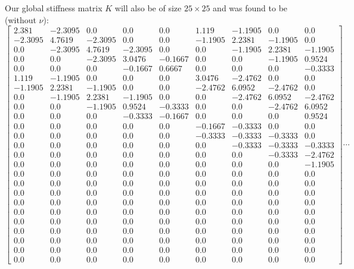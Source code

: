 \documentclass[12pt]{article}
\begin{document}
Our global stiffness matrix $K$ will also be of size $25 \times 25$ and was found to be (without $\nu$):
\[\left[\begin{matrix}2.381 & -2.3095 & 0.0 & 0.0 & 0.0 & 1.119 & -1.1905 & 0.0 & 0.0\\-2.3095 & 4.7619 & -2.3095 & 0.0 & 0.0 & -1.1905 & 2.2381 & -1.1905 & 0.0\\0.0 & -2.3095 & 4.7619 & -2.3095 & 0.0 & 0.0 & -1.1905 & 2.2381 & -1.1905\\0.0 & 0.0 & -2.3095 & 3.0476 & -0.1667 & 0.0 & 0.0 & -1.1905 & 0.9524\\0.0 & 0.0 & 0.0 & -0.1667 & 0.6667 & 0.0 & 0.0 & 0.0 & -0.3333\\1.119 & -1.1905 & 0.0 & 0.0 & 0.0 & 3.0476 & -2.4762 & 0.0 & 0.0\\-1.1905 & 2.2381 & -1.1905 & 0.0 & 0.0 & -2.4762 & 6.0952 & -2.4762 & 0.0\\0.0 & -1.1905 & 2.2381 & -1.1905 & 0.0 & 0.0 & -2.4762 & 6.0952 & -2.4762\\0.0 & 0.0 & -1.1905 & 0.9524 & -0.3333 & 0.0 & 0.0 & -2.4762 & 6.0952\\0.0 & 0.0 & 0.0 & -0.3333 & -0.1667 & 0.0 & 0.0 & 0.0 & 0.9524\\0.0 & 0.0 & 0.0 & 0.0 & 0.0 & -0.1667 & -0.3333 & 0.0 & 0.0\\0.0 & 0.0 & 0.0 & 0.0 & 0.0 & -0.3333 & -0.3333 & -0.3333 & 0.0\\0.0 & 0.0 & 0.0 & 0.0 & 0.0 & 0.0 & -0.3333 & -0.3333 & -0.3333\\0.0 & 0.0 & 0.0 & 0.0 & 0.0 & 0.0 & 0.0 & -0.3333 & -2.4762\\0.0 & 0.0 & 0.0 & 0.0 & 0.0 & 0.0 & 0.0 & 0.0 & -1.1905\\0.0 & 0.0 & 0.0 & 0.0 & 0.0 & 0.0 & 0.0 & 0.0 & 0.0\\0.0 & 0.0 & 0.0 & 0.0 & 0.0 & 0.0 & 0.0 & 0.0 & 0.0\\0.0 & 0.0 & 0.0 & 0.0 & 0.0 & 0.0 & 0.0 & 0.0 & 0.0\\0.0 & 0.0 & 0.0 & 0.0 & 0.0 & 0.0 & 0.0 & 0.0 & 0.0\\0.0 & 0.0 & 0.0 & 0.0 & 0.0 & 0.0 & 0.0 & 0.0 & 0.0\\0.0 & 0.0 & 0.0 & 0.0 & 0.0 & 0.0 & 0.0 & 0.0 & 0.0\\0.0 & 0.0 & 0.0 & 0.0 & 0.0 & 0.0 & 0.0 & 0.0 & 0.0\\0.0 & 0.0 & 0.0 & 0.0 & 0.0 & 0.0 & 0.0 & 0.0 & 0.0\\0.0 & 0.0 & 0.0 & 0.0 & 0.0 & 0.0 & 0.0 & 0.0 & 0.0\\0.0 & 0.0 & 0.0 & 0.0 & 0.0 & 0.0 & 0.0 & 0.0 & 0.0\end{matrix}\right]\cdots\]
\end{document}
